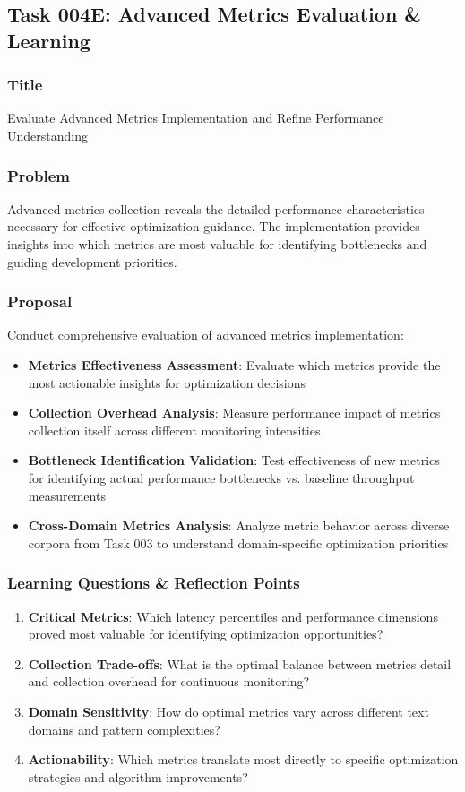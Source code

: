 \documentclass[11pt,a4paper]{article}
\begin{document}
\subsection{Task 004E: Advanced Metrics Evaluation \& Learning}

\subsubsection{Title}
Evaluate Advanced Metrics Implementation and Refine Performance Understanding

\subsubsection{Problem}
Advanced metrics collection reveals the detailed performance characteristics necessary for effective optimization guidance. The implementation provides insights into which metrics are most valuable for identifying bottlenecks and guiding development priorities.

\subsubsection{Proposal}
Conduct comprehensive evaluation of advanced metrics implementation:
\begin{itemize}
    \item \textbf{Metrics Effectiveness Assessment}: Evaluate which metrics provide the most actionable insights for optimization decisions
    \item \textbf{Collection Overhead Analysis}: Measure performance impact of metrics collection itself across different monitoring intensities
    \item \textbf{Bottleneck Identification Validation}: Test effectiveness of new metrics for identifying actual performance bottlenecks vs. baseline throughput measurements
    \item \textbf{Cross-Domain Metrics Analysis}: Analyze metric behavior across diverse corpora from Task 003 to understand domain-specific optimization priorities
\end{itemize}

\subsubsection{Learning Questions \& Reflection Points}
\begin{enumerate}
    \item \textbf{Critical Metrics}: Which latency percentiles and performance dimensions proved most valuable for identifying optimization opportunities?
    \item \textbf{Collection Trade-offs}: What is the optimal balance between metrics detail and collection overhead for continuous monitoring?
    \item \textbf{Domain Sensitivity}: How do optimal metrics vary across different text domains and pattern complexities?
    \item \textbf{Actionability}: Which metrics translate most directly to specific optimization strategies and algorithm improvements?
\end{enumerate}
\end{document}
